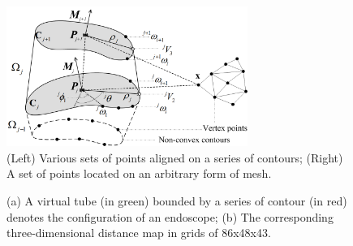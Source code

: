 \begin{figure}[ht]
\begin{center}
\includegraphics[width=0.7\textwidth]{3_precision/figures/pqa}
\end{center}
\caption[Various sets of points aligned on a series of contours; A set of points located on an arbitrary form of mesh.]{(Left) Various sets of points aligned on a series of contours; 
(Right) A set of points located on an arbitrary form of mesh.}
\label{fig:pqa}
\end{figure}

\setcounter{subfigure}{0}
\begin{figure}[t!]
\centering
{}
\caption[(a) A virtual tube bounded by a series of contour denotes the configuration of an endoscope;
(b) The corresponding three-dimensional distance map in grids of 86x48x43.]{(a) A virtual tube (in green) bounded by a series of contour (in red) denotes the configuration of an endoscope;
(b) The corresponding three-dimensional distance map in grids of 86x48x43.}
\label{fig:tube}
\end{figure}

